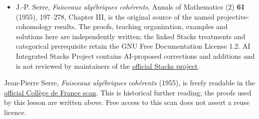 \documentclass[11pt]{article}
\begin{document}
\begin{itemize}
{  01VT}. Lemma 1.3 above proves the required embedding, including the
  proper graph argument; the corresponding geometric reference is
  \href{https://kokunoyumeto.github.io/stacks-zh-hans-cn/en/morphisms.html\#morphisms-lemma-image-proper-scheme-closed}{Tag
  01W6}. These are geometric prerequisites, rather than appeals to a
  later cohomological theorem.
\item
  J.-P. Serre, \emph{Faisceaux algébriques cohérents}, Annals of
  Mathematics (2) \textbf{61} (1955), 197--278, Chapter III, is the
  original source of the named projective-cohomology results. The
  proofs, teaching organization, examples and solutions here are
  independently written; the linked Stacks treatments and categorical
  prerequisite retain the GNU Free Documentation License 1.2. AI
  Integrated Stacks Project contains AI-proposed corrections and
  additions and is not reviewed by maintainers of the
  \href{https://stacks.math.columbia.edu/}{official Stacks project}.
\end{itemize}

Jean-Pierre Serre, \emph{Faisceaux algébriques cohérents} (1955), is
freely readable in the
\href{https://www.college-de-france.fr/media/jean-pierre-serre/UPL5435398796951750634_Serre_FAC.pdf}{official
Collège de France scan}. This is historical further reading; the proofs
used by this lesson are written above. Free access to this scan does not
assert a reuse licence.
\end{document}
